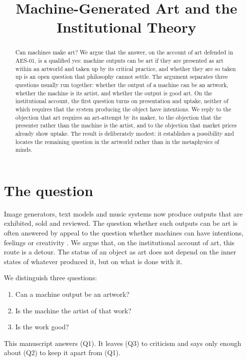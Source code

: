 \documentclass{situationist-preprint}
\title{Machine-Generated Art and the Institutional Theory}
\begin{document}
\maketitle

\begin{abstract}
Can machines make art? We argue that the answer, on the account of art defended in AES-01, is a qualified yes: machine outputs can be art if they are presented as art within an artworld and taken up by its critical practice, and whether they are so taken up is an open question that philosophy cannot settle. The argument separates three questions usually run together: whether the output of a machine can be an artwork, whether the machine is its artist, and whether the output is good art. On the institutional account, the first question turns on presentation and uptake, neither of which requires that the system producing the object have intentions. We reply to the objection that art requires an art-attempt by its maker, to the objection that the presenter rather than the machine is the artist, and to the objection that market prices already show uptake. The result is deliberately modest: it establishes a possibility and locates the remaining question in the artworld rather than in the metaphysics of minds.
\end{abstract}

\section{The question}

Image generators, text models and music systems now produce outputs that are exhibited, sold and reviewed. The question whether such outputs can be art is often answered by appeal to the question whether machines can have intentions, feelings or creativity \citep{Boden2010,Coeckelbergh2017,Hertzmann2018}. We argue that, on the institutional account of art, this route is a detour. The status of an object as art does not depend on the inner states of whatever produced it, but on what is done with it.

We distinguish three questions:
\begin{enumerate}
\item[(Q1)] Can a machine output be an artwork?
\item[(Q2)] Is the machine the artist of that work?
\item[(Q3)] Is the work good?
\end{enumerate}
This manuscript answers (Q1). It leaves (Q3) to criticism and says only enough about (Q2) to keep it apart from (Q1).
\end{document}
